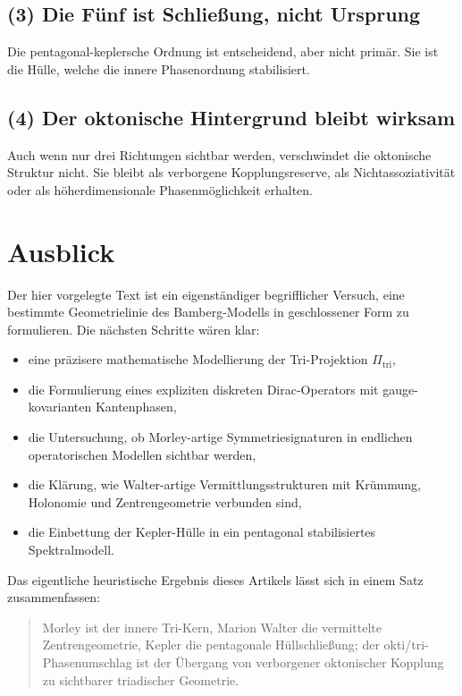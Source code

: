 \documentclass[11pt,a4paper]{article}
\theoremstyle{remark}
\begin{document}
	\subsection*{(3) Die Fünf ist Schließung, nicht Ursprung}
	Die pentagonal-keplersche Ordnung ist entscheidend, aber nicht primär. Sie ist die Hülle, welche die innere Phasenordnung stabilisiert.
	
	\subsection*{(4) Der oktonische Hintergrund bleibt wirksam}
	Auch wenn nur drei Richtungen sichtbar werden, verschwindet die oktonische Struktur nicht. Sie bleibt als verborgene Kopplungsreserve, als Nichtassoziativität oder als höherdimensionale Phasenmöglichkeit erhalten.
	
	\section{Ausblick}
	
	Der hier vorgelegte Text ist ein eigenständiger begrifflicher Versuch, eine bestimmte Geometrielinie des Bamberg-Modells in geschlossener Form zu formulieren. Die nächsten Schritte wären klar:
	\begin{itemize}
		\item eine präzisere mathematische Modellierung der Tri-Projektion $\Pi_{\mathrm{tri}}$,
		\item die Formulierung eines expliziten diskreten Dirac-Operators mit gauge-kovarianten Kantenphasen,
		\item die Untersuchung, ob Morley-artige Symmetriesignaturen in endlichen operatorischen Modellen sichtbar werden,
		\item die Klärung, wie Walter-artige Vermittlungsstrukturen mit Krümmung, Holonomie und Zentrengeometrie verbunden sind,
		\item die Einbettung der Kepler-Hülle in ein pentagonal stabilisiertes Spektralmodell.
	\end{itemize}
	
	Das eigentliche heuristische Ergebnis dieses Artikels lässt sich in einem Satz zusammenfassen:
	\begin{quote}
		Morley ist der innere Tri-Kern, Marion Walter die vermittelte Zentrengeometrie, Kepler die pentagonale Hüllschließung; der okti/tri-Phasenumschlag ist der Übergang von verborgener oktonischer Kopplung zu sichtbarer triadischer Geometrie.
	\end{quote}
	
\end{document}
